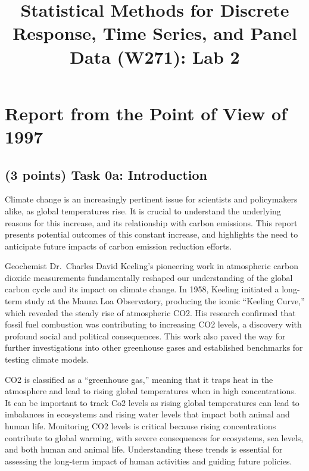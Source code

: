 \documentclass[
]{article}
\title{Statistical Methods for Discrete Response, Time Series, and Panel Data (W271): Lab 2}
\author{}
\date{\vspace{-2.5em}}
\begin{document}
\maketitle

{
\setcounter{tocdepth}{2}
\tableofcontents
}
\newpage

\section{Report from the Point of View of 1997}\label{report-from-the-point-of-view-of-1997}

\subsection{(3 points) Task 0a: Introduction}\label{points-task-0a-introduction}

Climate change is an increasingly pertinent issue for scientists and policymakers alike, as global temperatures rise. It is crucial to understand the underlying reasons for this increase, and its relationship with carbon emissions. This report presents potential outcomes of this constant increase, and highlights the need to anticipate future impacts of carbon emission reduction efforts.

Geochemist Dr.~Charles David Keeling's pioneering work in atmospheric carbon dioxide measurements fundamentally reshaped our understanding of the global carbon cycle and its impact on climate change. In 1958, Keeling initiated a long-term study at the Mauna Loa Observatory, producing the iconic ``Keeling Curve,'' which revealed the steady rise of atmospheric CO2. His research confirmed that fossil fuel combustion was contributing to increasing CO2 levels, a discovery with profound social and political consequences. This work also paved the way for further investigations into other greenhouse gases and established benchmarks for testing climate models.

CO2 is classified as a ``greenhouse gas,'' meaning that it traps heat in the atmosphere and lead to rising global temperatures when in high concentrations. It can be important to track Co2 levels as rising global temperatures can lead to imbalances in ecosystems and rising water levels that impact both animal and human life. Monitoring CO2 levels is critical because rising concentrations contribute to global warming, with severe consequences for ecosystems, sea levels, and both human and animal life. Understanding these trends is essential for assessing the long-term impact of human activities and guiding future policies.
\end{document}
